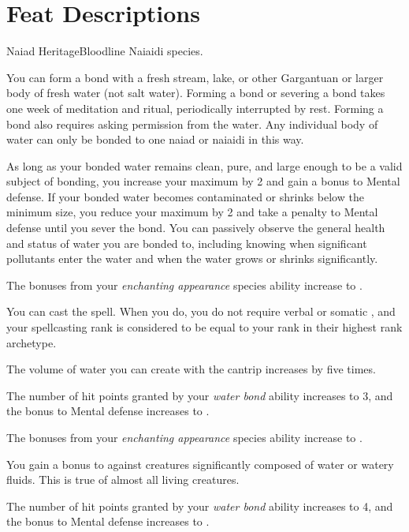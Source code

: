     \section{Feat Descriptions}

    \begin{feat}{Naiad Heritage}{Bloodline}
        \featpre Naiaidi species.

         You can form a bond with a fresh stream, lake, or other Gargantuan or larger body of fresh water (not salt water).
        Forming a bond or severing a bond takes one week of meditation and ritual, periodically interrupted by rest.
        Forming a bond also requires asking permission from the water.
        Any individual body of water can only be bonded to one naiad or naiaidi in this way.

        As long as your bonded water remains clean, pure, and large enough to be a valid subject of bonding, you increase your maximum  by 2 and gain a  bonus to Mental defense.
        If your bonded water becomes contaminated or shrinks below the minimum size, you reduce your maximum  by 2 and take a  penalty to Mental defense until you sever the bond.
        You can passively observe the general health and status of water you are bonded to, including knowing when significant pollutants enter the water and when the water grows or shrinks significantly.

         The bonuses from your \textit{enchanting appearance} species ability increase to .

         You can cast the  spell.
        When you do, you do not require verbal or somatic , and your spellcasting rank is considered to be equal to your rank in their highest rank archetype.

         The volume of water you can create with the  cantrip increases by five times.

         The number of hit points granted by your \textit{water bond} ability increases to 3, and the bonus to Mental defense increases to .

         The bonuses from your \textit{enchanting appearance} species ability increase to .

         You gain a  bonus to  against creatures significantly composed of water or watery fluids.
        This is true of almost all living creatures.

         The number of hit points granted by your \textit{water bond} ability increases to 4, and the bonus to Mental defense increases to .
    \end{feat}
